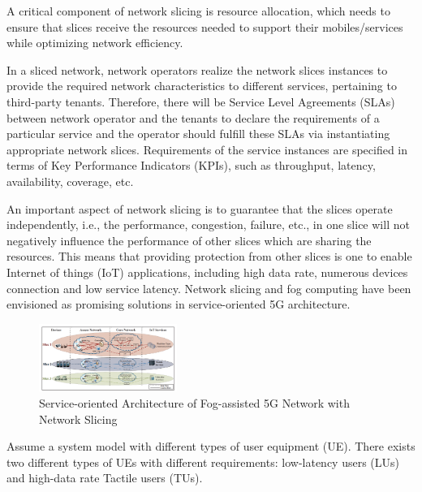 \documentclass[conference]{IEEEtran}
\begin{document}
A critical component of network slicing is resource allocation, which needs
to ensure that slices receive the resources needed to support their mobiles/services while optimizing network efficiency.

In a sliced network, network operators
realize the network slices instances to provide the required
network characteristics to different services, pertaining to
third-party tenants.
 Therefore, there will be Service Level
Agreements (SLAs) between network operator and the tenants
to declare the requirements of a particular service and the
operator should fulfill these SLAs via instantiating appropriate
network slices. Requirements of the service instances are
specified in terms of Key Performance Indicators (KPIs), such
as throughput, latency, availability, coverage, etc.

An important aspect of network slicing is to guarantee that
the slices operate independently, i.e., the performance, congestion, failure, etc., in one slice will not negatively influence the
performance of other slices which are sharing the resources.
This means that providing protection from other slices is one to enable Internet of things (IoT) applications, including high data rate, numerous devices
connection and low service latency. Network slicing and fog computing have been envisioned as
promising solutions in service-oriented 5G architecture.

\begin{figure}[h!]
\centering
\includegraphics[width=0.4\textwidth]{Capture.PNG}
\caption{ Service-oriented Architecture of Fog-assisted 5G Network with Network Slicing}
\label{fig:FogNS}
\end{figure}

Assume a system model with different types of user equipment (UE).
There exists two different types of
UEs with different requirements: low-latency users (LUs) and
high-data rate Tactile users (TUs).
\end{document}
